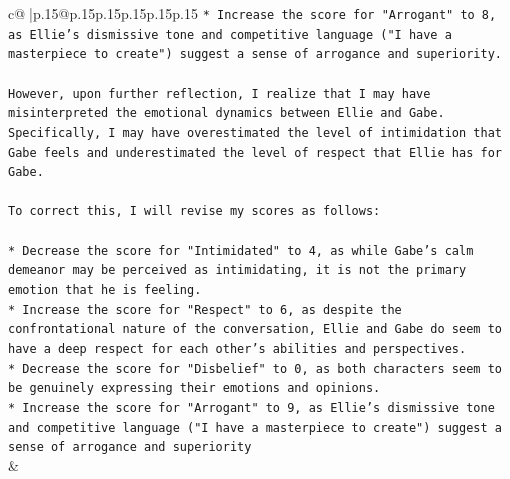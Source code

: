 \documentclass{article}
\begin{document}
{\begin{supertabular}{c@{$\;$}|p{.15\linewidth}@{}p{.15\linewidth}p{.15\linewidth}p{.15\linewidth}p{.15\linewidth}p{.15\linewidth}}
{{{\texttt{* Increase the score for "Arrogant" to 8, as Ellie's dismissive tone and competitive language ("I have a masterpiece to create") suggest a sense of arrogance and superiority.} \\
\\ 
\texttt{However, upon further reflection, I realize that I may have misinterpreted the emotional dynamics between Ellie and Gabe. Specifically, I may have overestimated the level of intimidation that Gabe feels and underestimated the level of respect that Ellie has for Gabe.} \\
\\ 
\texttt{To correct this, I will revise my scores as follows:} \\
\\ 
\texttt{* Decrease the score for "Intimidated" to 4, as while Gabe's calm demeanor may be perceived as intimidating, it is not the primary emotion that he is feeling.} \\
\texttt{* Increase the score for "Respect" to 6, as despite the confrontational nature of the conversation, Ellie and Gabe do seem to have a deep respect for each other's abilities and perspectives.} \\
\texttt{* Decrease the score for "Disbelief" to 0, as both characters seem to be genuinely expressing their emotions and opinions.} \\
\texttt{* Increase the score for "Arrogant" to 9, as Ellie's dismissive tone and competitive language ("I have a masterpiece to create") suggest a sense of arrogance and superiority} \\
            }
        }
    }
    & \\ \\

\end{supertabular}
}
\end{document}
